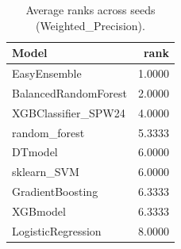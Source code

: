 \begin{table}[t]
\centering
\begin{tabular}{lr}
\toprule
Model & rank \\
\midrule
EasyEnsemble & 1.0000 \\
BalancedRandomForest & 2.0000 \\
XGBClassifier_SPW24 & 4.0000 \\
random_forest & 5.3333 \\
DTmodel & 6.0000 \\
sklearn_SVM & 6.0000 \\
GradientBoosting & 6.3333 \\
XGBmodel & 6.3333 \\
LogisticRegression & 8.0000 \\
\bottomrule
\end{tabular}
\caption{Average ranks across seeds (Weighted_Precision).}
\label{tab:avg_rank_Weighted_Precision}
\end{table}